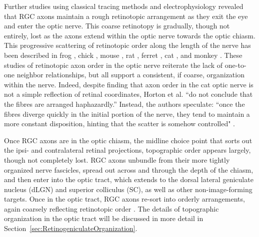 Further studies using classical tracing methods and electrophysiology revealed that RGC axons maintain a rough retinotopic arrangement as they exit the eye and enter the optic nerve.
This coarse retinotopy is gradually, though not entirely, lost as the axons extend within the optic nerve towards the optic chiasm.
This progressive scattering of retinotopic order along the length of the nerve has been described in frog \cite{montgomery1998organization}, chick \cite{ehrlich1984course}, mouse \cite{chan1999changes,plas2005pretarget}, rat \cite{chan1994changes,simon1991relationship}, ferret \cite{reese1993reestablishment}, cat \cite{horton1979non,naito1986course}, and monkey \cite{naito1994retinogeniculate}.
These studies of retinotopic axon order in the optic nerve reiterate the lack of one-to-one neighbor relationships, but all support a consistent, if coarse, organization within the nerve.
Indeed, despite finding that axon order in the cat optic nerve is not a simple reflection of retinal coordinates, Horton et al. “do not conclude that the fibres are arranged haphazardly.”
Instead, the authors speculate: “once the fibres diverge quickly in the initial portion of the nerve, they tend to maintain a more constant disposition, hinting that the scatter is somehow controlled" \cite{horton1979non}.

Once RGC axons are in the optic chiasm, the midline choice point that sorts out the ipsi- and contralateral retinal projections, topographic order appears largely, though not completely lost.
RGC axons unbundle from their more tightly organized nerve fascicles, spread out across and through the depth of the chiasm, and then enter into the optic tract, which extends to the dorsal lateral geniculate nucleus (dLGN) and superior colliculus (SC), as well as other non-image-forming targets.
Once in the optic tract, RGC axons re-sort into orderly arrangements, again coarsely reflecting retinotopic order \cite{chan1999changes,chan1994changes,plas2005pretarget,reese1993reestablishment,reh1983organization,torrealba1982studies}.
The details of topographic organization in the optic tract will be discussed in more detail in Section~\ref{sec:RetinogeniculateOrganization}.

